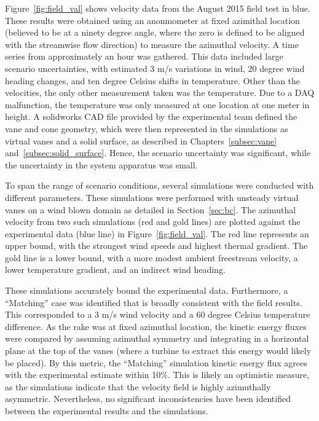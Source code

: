 Figure~\ref{fig:field_val} shows velocity data from the 
August 2015 field test in blue. These results were 
obtained using an anonmometer at fixed
azimithal location (believed to be at a ninety degree angle, where the zero
is defined to be aligned with the streamwise flow direction) to measure the
azimuthal velocity. A time
series from approximately an hour was gathered. This data included large
scenario uncertainties, with estimated 3 m/s variations in wind, 20
degree wind heading changes, and ten degree Celsius shifts in
temperature. Other than the velocities, the only other measurement
taken was the temperature. Due to a DAQ malfunction, the
temperature was only measured at one location at one meter in height. 
A solidworks CAD file provided by the experimental team
defined the vane and cone geometry, which were then represented in the
simulations as virtual vanes and a solid surface, as described in 
Chapters~\ref{subsec:vane} and~\ref{subsec:solid_surface}. Hence, the
scenario uncertainty was significant, while the uncertainty in the
system apparatus was small. 

To span the range of scenario conditions, several simulations were conducted
with different parameters. These simulations were performed with
unsteady virtual vanes on a wind blown domain as detailed in
Section~\ref{sec:bc}.  The azimuthal velocity from two such
simulations (red and gold lines) are plotted against the experimental
data (blue line) in Figure~\ref{fig:field_val}. The red line represents
an upper bound, with the strongest wind speeds and highest thermal
gradient. The gold line is a lower bound, with a more modest ambient
freestream velocity, a lower temperature gradient, and an indirect wind
heading. 

These simulations accurately bound the experimental data. Furthermore, a
``Matching'' case was identified that is broadly consistent with the
field results. This corresponded to a 3 m/s wind velocity and a 60
degree Celsius temperature difference. 
As the rake was at fixed azimuthal location, the kinetic energy fluxes were
compared by assuming azimuthal symmetry and integrating in a horizontal
plane at the top of the vanes (where a turbine to extract this energy
would likely be placed). By this metric, the ``Matching'' simulation
kinetic energy flux agrees with the experimental estimate within
10\%. This is likely an optimistic measure, as the simulations indicate
that the velocity field is highly azimuthally asymmetric. Nevertheless,
no significant inconsistencies have been identified between the
experimental results and the simulations. 

%
% 
%
% 
%
%
%
%
